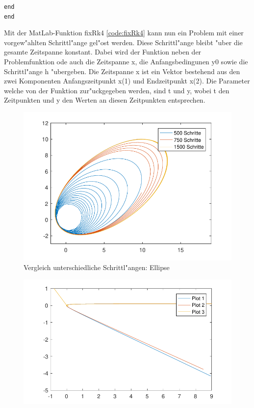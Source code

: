 \begin{refsection}
\begin{lstlisting}[style=Matlab, caption=Konstante Schrittl"ange, captionpos=b, label=code:fixRk4]
    end
end
\end{lstlisting}
Mit der MatLab-Funktion fixRk4 \ref{code:fixRk4} kann nun ein Problem mit einer vorgew"ahlten Schrittl"ange gel"ost werden.
Diese Schrittl"ange bleibt "uber die gesamte Zeitspanne konstant.
Dabei wird der Funktion neben der Problemfunktion ode auch die Zeitspanne x, die Anfangsbedingunen y0 sowie die Schrittl"ange h "ubergeben.
Die Zeitspanne x ist ein Vektor bestehend aus den zwei Komponenten Anfangszeitpunkt x(1) und Endzeitpunkt x(2).
Die Parameter welche von der Funktion zur"uckgegeben werden, sind t und y, wobei t den Zeitpunkten und y den Werten an diesen Zeitpunkten entsprechen.
\begin{figure}
\centering
\includegraphics{schrittlaenge/images/fixStepVergleichEllipse.pdf}
\caption{Vergleich unterschiedliche Schrittl"angen: Ellipse}
\label{image:fixStepVergleichEllipse}
\end{figure}
\begin{figure}
\centering
\includegraphics{schrittlaenge/images/fixStepVergleichHyperbel.pdf}

\end{figure}
\end{refsection}
